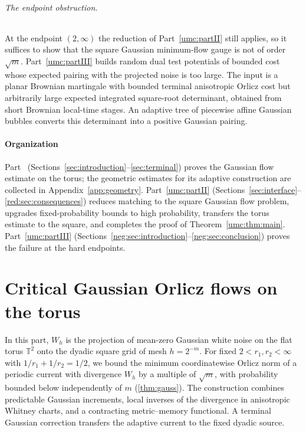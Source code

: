 \documentclass[11pt]{article}
\theoremstyle{definition}
\theoremstyle{remark}
\numberwithin{equation}{section}
\newcommand{\T}{\mathbb T}
\begin{document}
\paragraph{The endpoint obstruction.}
At the endpoint $(2,\infty)$ the reduction of Part~\ref{umc:partII}
still applies, so it suffices to show that the square Gaussian
minimum-flow gauge is not of order $\sqrt m$. Part~\ref{umc:partIII}
builds random dual test potentials of bounded cost whose expected
pairing with the projected noise is too large. The input is a planar
Brownian martingale with bounded terminal anisotropic Orlicz cost but
arbitrarily large expected integrated square-root determinant,
obtained from short Brownian local-time stages. An adaptive tree of
piecewise affine Gaussian bubbles converts this determinant into a
positive Gaussian pairing.

\subsection{Organization}
Part~\ref{umc:partI} (Sections~\ref{sec:introduction}--\ref{sec:terminal})
proves the Gaussian flow estimate on the torus; the geometric estimates
for its adaptive construction are collected in
Appendix~\ref{app:geometry}. Part~\ref{umc:partII}
(Sections~\ref{sec:interface}--\ref{red:sec:consequences}) reduces
matching to the square Gaussian flow problem, upgrades fixed-probability
bounds to high probability, transfers the torus estimate to the square,
and completes the proof of Theorem~\ref{umc:thm:main}.
Part~\ref{umc:partIII}
(Sections~\ref{neg:sec:introduction}--\ref{neg:sec:conclusion}) proves
the failure at the hard endpoints.

\clearpage
\part{Critical Gaussian Orlicz flows on the torus}\label{umc:partI}

In this part, $W_h$ is the projection of mean-zero Gaussian white
noise on the flat torus $\T^2$ onto the dyadic square grid of mesh
$h=2^{-m}$. For fixed $2<r_1,r_2<\infty$ with $1/r_1+1/r_2=1/2$, we
bound the minimum coordinatewise Orlicz norm of a periodic current
with divergence $W_h$ by a multiple of $\sqrt m$, with probability
bounded below independently of $m$ (\cref{thm:gauss}). The construction combines predictable Gaussian increments,
local inverses of the divergence in anisotropic Whitney charts, and a
contracting metric--memory functional. A terminal Gaussian correction
transfers the adaptive current to the fixed dyadic source.
\end{document}
